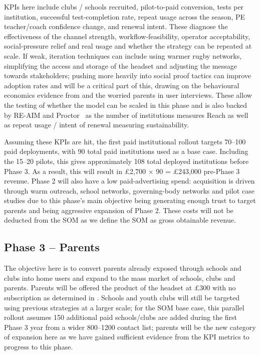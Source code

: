 KPIs here include clubs / schools recruited, pilot-to-paid conversion, tests per institution, successful test-completion rate, repeat usage across the season, PE teacher/coach confidence change, and renewal intent. These diagnose the effectiveness of the channel strength, workflow-feasibility, operator acceptability, social-pressure relief and real usage and whether the strategy can be repeated at scale. If weak, iteration techniques can include using warmer rugby networks, simplifying the access and storage of the headset and adjusting the message towards stakeholders; pushing more heavily into social proof tactics can improve adoption rates and will be a critical part of this, drawing on the behavioural economics evidence from  and the worried parents in user interviews. These allow the testing of whether the model can be scaled in this phase and is also backed by RE-AIM and Proctor~\cite{reaim_framework,proctor2011implementation} as the number of institutions measures Reach as well as repeat usage / intent of renewal measuring sustainability.

Assuming these KPIs are hit, the first paid institutional rollout targets 70--100 paid deployments, with 90 total paid institutions used as a base case. Including the 15--20 pilots, this gives approximately 108 total deployed institutions before Phase 3. As a result, this will result in \pounds{}2,700 $\times$ 90 = \pounds{}243,000 pre-Phase 3 revenue. Phase 2 will also have a low paid-advertising spend: acquisition is driven through warm outreach, school networks, governing-body networks and pilot case studies due to this phase's main objective being generating enough trust to target parents and being aggressive expansion of Phase 2. These costs will not be deducted from the SOM as we define the SOM as gross obtainable revenue.

\subsection{Phase 3 -- Parents}

The objective here is to convert parents already exposed through schools and clubs into home users and expand to the mass market of schools, clubs and parents. Parents will be offered the product of the headset at \pounds{}300 with no subscription as determined in . Schools and youth clubs will still be targeted using previous strategies at a larger scale; for the SOM base case, this parallel rollout assumes 150 additional paid schools/clubs are added during the first Phase 3 year from a wider 800--1200 contact list; parents will be the new category of expansion here as we have gained sufficient evidence from the KPI metrics to progress to this phase.

